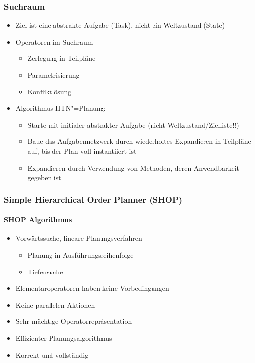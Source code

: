 \subsubsection{Suchraum}
\begin{itemize}
	\item Ziel ist eine abstrakte Aufgabe (Task), nicht ein Weltzustand (State)
	\item Operatoren im Suchraum
	\begin{itemize}
		\item Zerlegung in Teilpläne
		\item Parametrisierung
		\item Konfliktlösung
	\end{itemize}
	\item Algorithmus HTN"=Planung:
	\begin{itemize}
		\item Starte mit initialer abstrakter Aufgabe (nicht Weltzustand/Zielliste!!)
		\item Baue das Aufgabennetzwerk durch wiederholtes Expandieren in Teilpläne auf, bis der Plan voll instantiiert ist
		\item Expandieren durch Verwendung von Methoden, deren Anwendbarkeit gegeben ist
	\end{itemize}
\end{itemize}

\subsubsection{Simple Hierarchical Order Planner (SHOP)}
\paragraph{SHOP Algorithmus}
\begin{itemize}
	\item Vorwärtssuche, lineare Planungsverfahren
	\begin{itemize}
		\item Planung in Ausführungsreihenfolge
		\item Tiefensuche
	\end{itemize}
	\item Elementaroperatoren haben keine Vorbedingungen
	\item Keine parallelen Aktionen
	\item Sehr mächtige Operatorrepräsentation
	\item Effizienter Planungsalgorithmus
	\item Korrekt und vollständig
\end{itemize}
